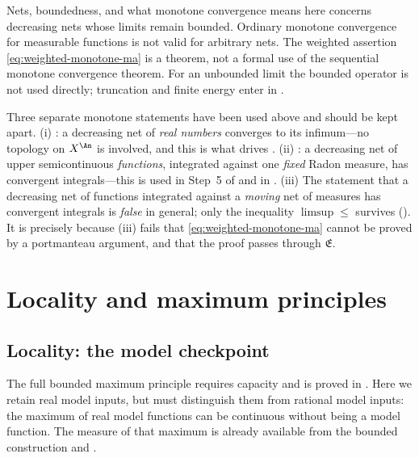 \begin{warning}{Nets, boundedness, and what monotone convergence means here}
 concerns decreasing nets whose limits
remain bounded. Ordinary monotone convergence for measurable functions is
not valid for arbitrary nets. The weighted assertion
\eqref{eq:weighted-monotone-ma} is a theorem, not a formal use of the
sequential monotone convergence theorem. For an unbounded limit the bounded
operator is not used directly; truncation and finite energy enter in
.

Three separate monotone statements have been used above and should be kept
apart.  (i) : a decreasing net of
\emph{real numbers} converges to its infimum---no topology on \(X^{\An}\) is
involved, and this is what drives
.  (ii)
: a decreasing net of upper
semicontinuous \emph{functions}, integrated against one \emph{fixed} Radon
measure, has convergent integrals---this is used in Step~5 of
 and in
.  (iii) The statement that a
decreasing net of functions integrated against a \emph{moving} net of
measures has convergent integrals is \emph{false} in general; only the
inequality \(\limsup\leq\) survives
().  It is precisely because (iii) fails
that \eqref{eq:weighted-monotone-ma} cannot be proved by a portmanteau
argument, and that the proof passes through \(\mathfrak E\).
\end{warning}

\section{Locality and maximum principles}
\label{sec:ch24-locality}

\subsection{Locality: the model checkpoint}
\label{sec:ch24-model-locality}

The full bounded maximum principle requires capacity and is proved in
.  Here we retain real model inputs,
but must distinguish them from rational model inputs: the maximum of
real model functions can be continuous without being a model function.
The measure of that maximum is already available from the bounded
construction and .

